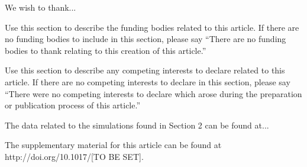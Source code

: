 \documentclass{aptpub}
\begin{document}
\acks %
\noindent We wish to thank...



\fund %
\noindent Use this section to describe the funding bodies related to this article. If there are no funding bodies to include in this section, please say ``There are no funding bodies to thank relating to this creation of this article.''



\competing %
\noindent Use this section to describe any competing interests to declare related to this article. If there are no competing interests to declare in this section, please say ``There were no competing interests to declare which arose during the preparation or publication process of this article.''



\data %
\noindent The data related to the simulations found in Section 2 can be found at...



\supp \noindent The supplementary material for this article can be found at http://doi.org/10.1017/[TO BE SET]. %



%
%
%
%



\end{document}
